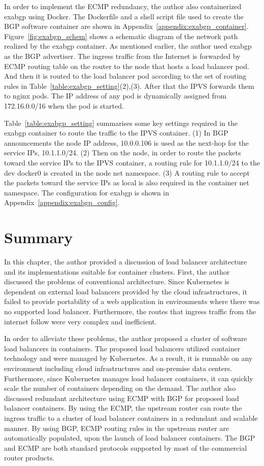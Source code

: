 In order to implement the ECMP redundancy, the author also containerized exabgp using Docker.
The Dockerfile and a shell script file used to create the BGP software container are shown in Appendix~\ref{appendix:exabgp_container}. 
Figure~\ref{fig:exabgp_schem} shows a schematic diagram of the network path realized by the exabgp container.
As mentioned earlier, the author used exabgp as the BGP advertiser. 
The ingress traffic from the Internet is forwarded by ECMP routing table on the router to the node that hosts a load balancer pod.
And then it is routed to the load balancer pod according to the set of routing rules in Table~\ref{table:exabgp_setting}(2),(3).
After that the IPVS forwards them to nginx pods.
The IP address of any pod is dynamically assigned from 172.16.0.0/16 when the pod is started. 

Table~\ref{table:exabgp_setting} summarises some key settings required in the exabgp container to route the traffic to the IPVS container.
(1) In BGP announcements the node IP address, 10.0.0.106 is used as the next-hop for the service IPs, 10.1.1.0/24.
(2) Then on the node, in order to route the packets toward the service IPs to the IPVS container, 
a routing rule for 10.1.1.0/24 to the dev docker0 is created in the node net namespace. 
(3) A routing rule to accept the packets toward the service IPs as local is also required in the container net namespace. 
The configuration for exabgp is shown in Appendix~\ref{appendix:exabgp_config}.

\FloatBarrier


\section{Summary}

In this chapter, the author provided a discussion of load balancer architecture and its implementations suitable for container clusters.
%
First, the author discussed the problems of conventional architecture.
Since Kubernetes is dependent on external load balancers provided by the cloud infrastructures,
it failed to provide portability of a web application in environments where there was no supported load balancer.
Furthermore, the routes that ingress traffic from the internet follow were very complex and inefficient.

In order to alleviate these problems, the author proposed a cluster of software load balancers in containers.
The proposed load balancers utilized container technology and were managed by Kubernetes.
As a result, it is runnable on any environment including cloud infrastructures and on-premise data centers.
Furthermore, since Kubernetes manages load balancer containers, it can quickly scale the number of containers depending on the demand.
%
The author also discussed redundant architecture using ECMP with BGP for proposed load balancer containers.
By using the ECMP, the upstream router can route the ingress traffic to a cluster of load balancer containers in a redundant and scalable manner.
By using BGP, ECMP routing rules in the upstream router are automatically populated, upon the launch of load balancer containers.
The BGP and ECMP are both standard protocols supported by most of the commercial router products.

